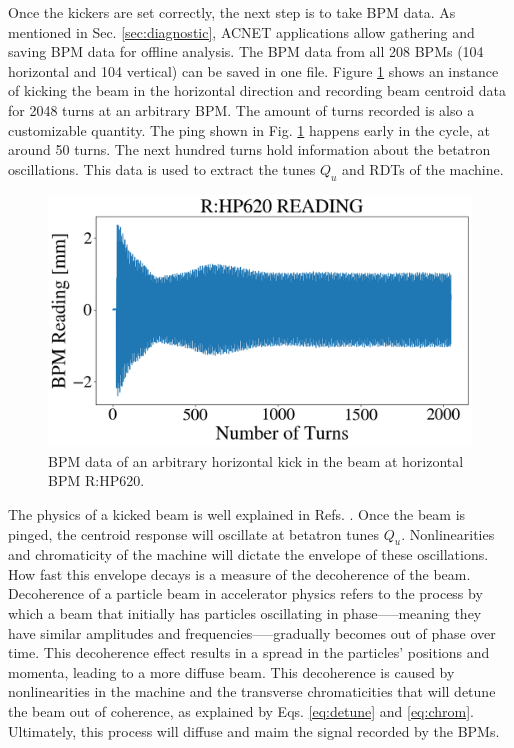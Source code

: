 Once the kickers are set correctly, the next step is to take BPM data. As mentioned in Sec. \ref{sec:diagnostic}, ACNET applications allow gathering and saving BPM data for offline analysis. The BPM data from all 208 BPMs (104 horizontal and 104 vertical) can be saved in one file. Figure \ref{fig:bpm_kick0} shows an instance of kicking the beam in the horizontal direction and recording beam centroid data for 2048 turns at an arbitrary BPM. The amount of turns recorded is also a customizable quantity. The ping shown in Fig. \ref{fig:bpm_kick0} happens early in the cycle, at around 50 turns. The next hundred turns hold information about the betatron oscillations. This data is used to extract the tunes $Q_u$ and RDTs of the machine.

\begin{figure}[H]
    \centering
    \includegraphics[width=\columnwidth]{chapter4/bpm_kick.png}
    \caption{BPM data of an arbitrary horizontal kick in the beam at horizontal BPM R:HP620.}
    \label{fig:bpm_kick0}
\end{figure}

The physics of a kicked beam is well explained in Refs. \cite{decoherence1,decoherence2}. Once the beam is pinged, the centroid response will oscillate at betatron tunes $Q_u$. Nonlinearities and chromaticity of the machine will dictate the envelope of these oscillations. How fast this envelope decays is a measure of the decoherence of the beam. Decoherence of a particle beam in accelerator physics refers to the process by which a beam that initially has particles oscillating in phase—--meaning they have similar amplitudes and frequencies—--gradually becomes out of phase over time. This decoherence effect results in a spread in the particles' positions and momenta, leading to a more diffuse beam. This decoherence is caused by nonlinearities in the machine and the transverse chromaticities that will detune the beam out of coherence, as explained by Eqs. \ref{eq:detune} and \ref{eq:chrom}. Ultimately, this process will diffuse and maim the signal recorded by the BPMs. 


